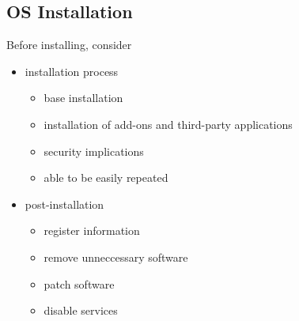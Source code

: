 \documentclass[xga]{xdvislides}
\begin{document}
\subsection{OS Installation}
Before installing, consider
\begin{itemize}
	\item installation process
		\begin{itemize}
			\item base installation
			\item installation of add-ons and third-party applications
			\item security implications
			\item able to be easily repeated
		\end{itemize}
	\item post-installation
		\begin{itemize}
			\item register information
			\item remove unneccessary software
			\item patch software
			\item disable services
		\end{itemize}
\end{itemize}

%
%
%
%
\end{document}
